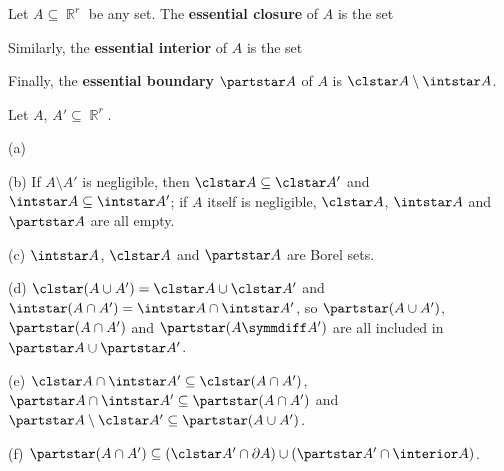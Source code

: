    Let $A\subseteq\BbbR^r$ be any
set.   The {\bf essential closure} of $A$ is the set


\noindent{}
Similarly, the {\bf essential interior} of $A$ is the set


\noindent{}Finally,
the {\bf essential boundary} $\partstar A$ of $A$
is $\clstar A\setminus\intstar A$.


 Let $A$,
$A'\subseteq\BbbR^r$.

(a)


(b) If $A\setminus A'$ is negligible, then
$\clstar A\subseteq\clstar A'$ and $\intstar A\subseteq\intstar A'$;
 if $A$ itself is negligible, $\clstar A$,
$\intstar A$ and $\partstar A$ are all empty.

(c) $\intstar A$, $\clstar A$ and $\partstar A$ are Borel sets.

(d) $\clstar(A\cup A')=\clstar A\cup\clstar A'$ and
$\intstar(A\cap A')=\intstar A\cap\intstar A'$, so
$\partstar(A\cup A')$, $\partstar(A\cap A')$ and
$\partstar(A\symmdiff A')$ are all included in
$\partstar A\cup\partstar A'$.

(e) $\clstar A\cap\intstar A'\subseteq\clstar(A\cap A')$,
$\partstar A\cap\intstar A'\subseteq\partstar(A\cap A')$ and
$\partstar A\setminus\clstar A'\subseteq\partstar(A\cup A')$.

(f) $\partstar(A\cap A')
  \subseteq(\clstar A'\cap\partial A)\cup(\partstar A'\cap\interior A)$.

